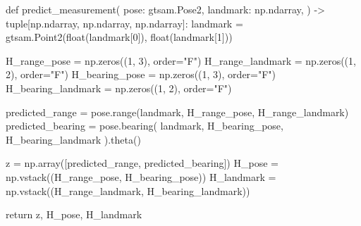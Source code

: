 \begin{pythoncode}
def predict_measurement(
    pose: gtsam.Pose2,
    landmark: np.ndarray,
) -> tuple[np.ndarray, np.ndarray, np.ndarray]:
    landmark = gtsam.Point2(float(landmark[0]), float(landmark[1]))

    H_range_pose = np.zeros((1, 3), order="F")
    H_range_landmark = np.zeros((1, 2), order="F")
    H_bearing_pose = np.zeros((1, 3), order="F")
    H_bearing_landmark = np.zeros((1, 2), order="F")

    predicted_range = pose.range(landmark, H_range_pose, H_range_landmark)
    predicted_bearing = pose.bearing(
        landmark, H_bearing_pose, H_bearing_landmark
    ).theta()

    z = np.array([predicted_range, predicted_bearing])
    H_pose = np.vstack((H_range_pose, H_bearing_pose))
    H_landmark = np.vstack((H_range_landmark, H_bearing_landmark))

    return z, H_pose, H_landmark
\end{pythoncode}
